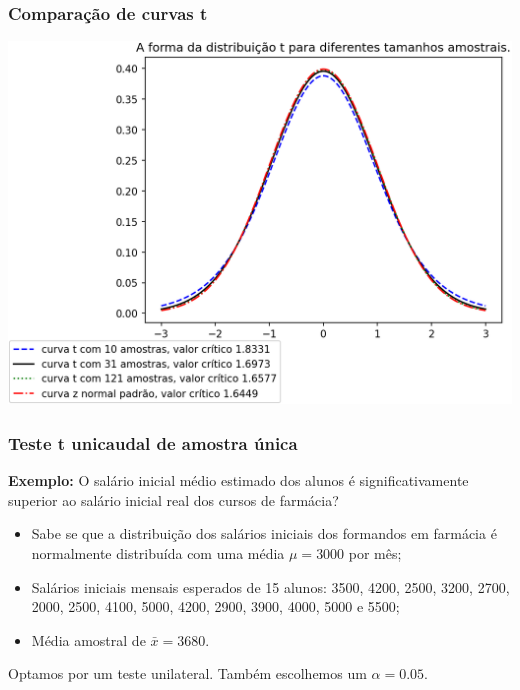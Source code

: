 \documentclass[11pt]{beamer}
\begin{document}
\begin{frame}
\frametitle{Comparação de curvas t}

\begin{center}\includegraphics[width=0.8\linewidth]{figs/comp_curvas_t.png} \end{center}

\end{frame}


\begin{frame}
\frametitle{Teste t unicaudal de amostra única}

\textbf{Exemplo:} O salário inicial médio estimado dos alunos é significativamente superior ao salário inicial real dos cursos de farmácia?

\begin{itemize}
\item Sabe se que a distribuição dos salários iniciais dos formandos em farmácia é normalmente distribuída com uma média $\mu = 3000$ por mês;
\item
   Salários iniciais mensais esperados de 15 alunos: 3500, 4200, 2500, 3200, 2700, 2000, 2500, 4100, 5000, 4200, 2900, 3900, 4000, 5000 e 5500;
\item
  Média amostral de $\bar{x} = 3680$.
\end{itemize}

Optamos por um teste unilateral. Também escolhemos um \(\alpha=0.05\).

\end{frame}
\end{document}

